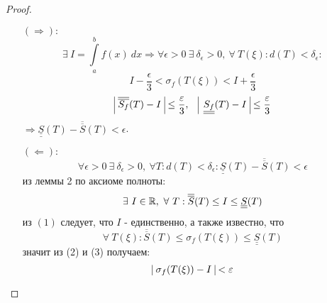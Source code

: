 \begin{proof} \ 
    \begin{itemize}
        \item[$(\Rightarrow):$]
        \[\exists\ I=\int\limits_{a}^{b}f(x)\ dx \Rightarrow \forall \epsilon>0\ \exists\ \delta_{\epsilon}>0,\ \forall\ T(\xi): d(T)<\delta_{\epsilon}:\]
        \[I-\frac{\epsilon}{3}<\sigma_f(T(\xi))<I+\frac{\epsilon}{3}\]
        \[\vline\ \overline{\overline{S_f}}(T)-I\ \vline \leq \frac{\epsilon}{3},\ \ \  \vline\ \underline{\underline{S_f}}(T)-I\ \vline \leq \frac{\epsilon}{3}\]
        $\Rightarrow \underline{\underline{S}}(T)-\overline{\overline{S}}(T)<\epsilon$.
        \item[$(\Leftarrow):$]
        \begin{equation}
            \forall \epsilon>0\ \exists\ \delta_{\epsilon}>0,\ \forall T: d(T)<\delta_{\epsilon}: \underline{\underline{S}}(T)-\overline{\overline{S}}(T)<\epsilon
        \end{equation}
        из леммы 2 по аксиоме полноты: 
        \begin{equation}
            \exists\ I\in \R,\ \forall\ T: \overline{\overline{S}}(T)\leq I\leq\underline{\underline{S}}(T)
        \end{equation}
        из $(1)$ следует, что $I$ - единственно, а также известно, что
        \begin{equation}
            \forall\ T(\xi): \overline{\overline{S}}(T)\leq \sigma_f(T(\xi))\leq \underline{\underline{S}}(T)
        \end{equation}
        значит из (2) и (3) получаем:
        \[\vline\ \sigma_f(T(\xi))-I \ \vline<\epsilon\]    
    \end{itemize}
\end{proof} 
